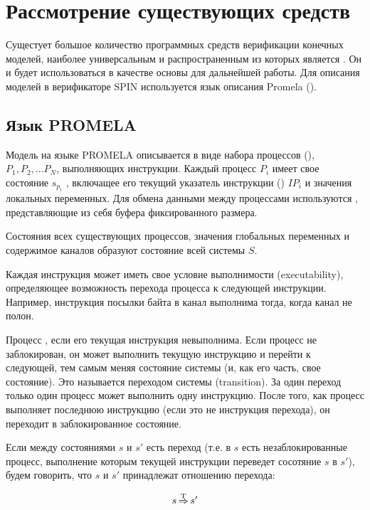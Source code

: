 \chapter{Рассмотрение существующих средств}
\label{cha:analogues}

Сущестует большое количество программных средств верификации конечных
моделей, наиболее универсальным и распространенным из которых является
 \cite{SpinRoot}. Он и будет использоваться в качестве
основы для дальнейшей работы. Для описания моделей в верификаторе SPIN
используется язык описания Promela ().

\section{Язык PROMELA}
\label{sec:promela}

Модель на языке PROMELA описывается в виде набора процессов
(), $P_1, P_2, ... P_N$, выполняющих инструкции. Каждый
процесс $P_i$ имеет свое состояние $s_{p_i}$ , включащее его текущий указатель
инструкции () $IP_i$ и значения
локальных переменных. Для обмена данными между процессами используются
, представляющие из себя буфера фиксированного размера.

Состояния всех существующих процессов, значения глобальных переменных
и содержимое каналов образуют состояние всей системы $S$.

Каждая инструкция может иметь свое условие выполнимости
(executability), определяющее возможность перехода процесса к
следующей инструкции. Например, инструкция посылки байта в канал
выполнима тогда, когда канал не полон.

Процесс , если его текущая инструкция
невыполнима. Если процесс не заблокирован, он может выполнить текущую
инструкцию и перейти к следующей, тем самым меняя состояние системы
(и, как его часть, свое состояние). Это называется переходом системы
(transition). За один переход только один процесс может выполнить одну
инструкцию. После того, как процесс выполняет последнюю инструкцию
(если это не инструкция перехода), он переходит в заблокированное
состояние.

Если между состояниями $s$ и $s'$ есть переход (т.е. в $s$ есть
незаблокированные процесс, выполнение которым текущей инструкции
переведет сосотяние $s$ в $s'$), будем говорить, что $s$ и $s'$
принадлежат отношению перехода:

\begin{equation}
  \label{eq:statetrans-def}
  s \operatorname{\operatorname*{\Rightarrow}^T} s'
\end{equation}

